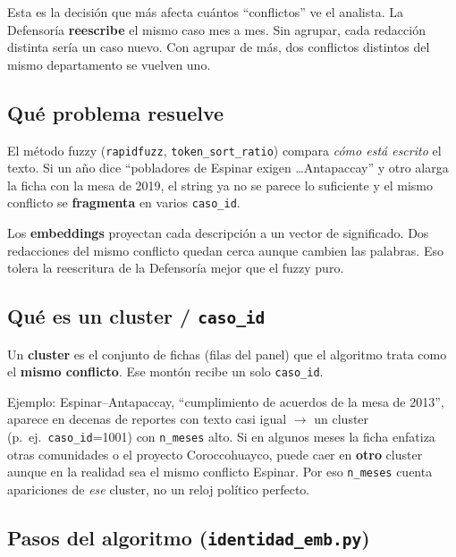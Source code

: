 \documentclass[11pt,a4paper]{article}
\begin{document}
Esta es la decisión que más afecta cuántos ``conflictos'' ve el analista. La Defensoría \textbf{reescribe} el mismo caso mes a mes. Sin agrupar, cada redacción distinta sería un caso nuevo. Con agrupar de más, dos conflictos distintos del mismo departamento se vuelven uno.

\subsection{Qué problema resuelve}

El método fuzzy (\texttt{rapidfuzz}, \texttt{token\_sort\_ratio}) compara \emph{cómo está escrito} el texto. Si un año dice ``pobladores de Espinar exigen \ldots Antapaccay'' y otro alarga la ficha con la mesa de 2019, el string ya no se parece lo suficiente y el mismo conflicto se \textbf{fragmenta} en varios \texttt{caso\_id}.

Los \textbf{embeddings} proyectan cada descripción a un vector de significado. Dos redacciones del mismo conflicto quedan cerca aunque cambien las palabras. Eso tolera la reescritura de la Defensoría mejor que el fuzzy puro.

\subsection{Qué es un cluster / \texttt{caso\_id}}

Un \textbf{cluster} es el conjunto de fichas (filas del panel) que el algoritmo trata como el \textbf{mismo conflicto}. Ese montón recibe un solo \texttt{caso\_id}.

Ejemplo: Espinar--Antapaccay, ``cumplimiento de acuerdos de la mesa de 2013'', aparece en decenas de reportes con texto casi igual $\rightarrow$ un cluster (p.\ ej.\ \texttt{caso\_id}=1001) con \texttt{n\_meses} alto. Si en algunos meses la ficha enfatiza otras comunidades o el proyecto Coroccohuayco, puede caer en \textbf{otro} cluster aunque en la realidad sea el mismo conflicto Espinar. Por eso \texttt{n\_meses} cuenta apariciones de \emph{ese} cluster, no un reloj político perfecto.

\subsection{Pasos del algoritmo (\texttt{identidad\_emb.py})}
\end{document}
